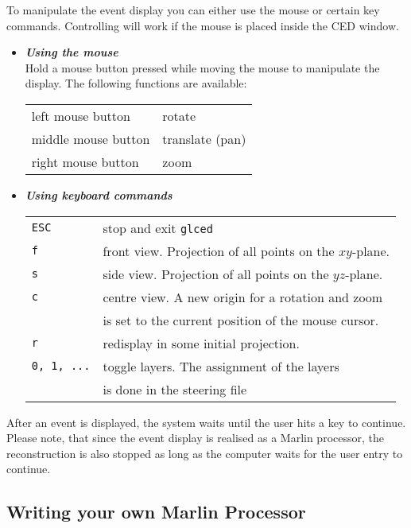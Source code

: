 To manipulate the event display you can either use the mouse or
certain key commands. Controlling will work if the mouse is placed
inside the CED window.

\begin{itemize}
\item {\em\bf Using the mouse} \\
      Hold a mouse button pressed while moving the mouse to
      manipulate the display. The following functions are available:

      \begin{center}
      \begin{tabular}{ll}
      left mouse button   & rotate \\
      middle mouse button & translate (pan)\\
      right mouse button  & zoom \\
      \end{tabular}
      \end{center}
\item {\em\bf Using keyboard commands} \\
      \begin{tabular}{ll}
      {\tt ESC} & stop and exit {\tt glced} \\
      {\tt f}   & front view. Projection of all points on the $xy$-plane.\\
      {\tt s}   & side view. Projection of all points on the $yz$-plane. \\
      {\tt c}   & centre view. A new origin for a rotation and zoom \\
                & is set to the current position of the mouse cursor.\\
      {\tt r}   & redisplay in some initial projection. \\
      {\tt 0, 1, ...} & toggle layers. The assignment of the layers \\
                      & is done in the steering file \\
      \end{tabular}
\end{itemize}

After an event is displayed, the system waits until the user hits a key
to continue. Please note, that since the event display is realised as a
Marlin processor, the reconstruction is also stopped as long as the computer
waits for the user entry to continue.

\subsection{Writing your own Marlin Processor}

